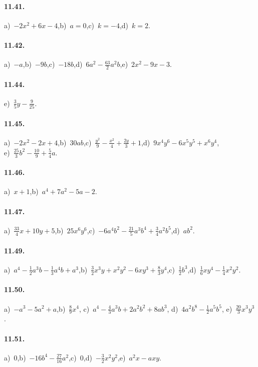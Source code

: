 \paragraph{11.41.}
a)~$-2x^2+6x-4$,\quad b)~$a=0$,\quad c)~$k=-4$,\quad d)~$k=2$.
\paragraph{11.42.} a)~$-a$,\quad b)~$-9b$,\quad c)~$-18b$,\quad d)~$6a^{2}-\frac{63}{2}a^{2}b$,\quad e)~$2x^2-9x-3$.
\paragraph{11.44.} e)~$\frac{3}{5}y-\frac{9}{25}$.
\paragraph{11.45.} a)~$-2x^{2}-2x+4$,\quad b)~$30ab$,\quad c)~$\frac{y^{2}}{9}-\frac{x^{2}}{4}+\frac{2y}{3}+1$,\quad d)~$9x^{4}y^{6}-6x^{5}y^{5}+x^{6}y^{4}$,\protect\\ e)~$\frac{25}{3}b^{2}-\frac{10}{9}+\frac{5}{4}a$.
\paragraph{11.46.} a)~$x+1$,\quad b)~$a^{4}+7a^{2}-5a-2$.
\paragraph{11.47.} a)~$\frac{33}{4}x+10y+5$,\quad b)~$25x^{6}y^{6}$,\quad c)~$-6a^{4}b^{2}-\frac{21}{5} a^{3}b^{4}+\frac{3}{4}a^{2}b^{5}$,\quad d)~$ab^{2}$. %
\paragraph{11.49.} a)~$a^{4}-\frac{1}{2}a^{3}b-\frac{1}{3}a^{4}b+a^{3}$,\quad b)~$\frac{3}{2}x^{3}y+x^{2}y^{2}-6{xy}^{3}+\frac{8}{3}y^{4}$,\quad c)~$\frac{1}{2}b^{3}$,\quad d)~$\frac{1}{6}xy^{4}-\frac{1}{4}x^{2}y^{2}$.
\paragraph{11.50.} a)~$-a^{3}-5a^{2}+a$,\quad b)~$\frac{8}{9}x^{4}$,\; c)~$a^{4}-\frac{4}{3}a^{3}b+2a^{2}b^{2}+8ab^{3}$,\; d)~$4a^{2}b^{8}-\frac{1}{2}a^{5}b^{5}$,\; e)~$\frac{20}{3}x^{3}y^{3}$.
\paragraph{11.51.} a)~$0$,\quad b)~$-16b^{4}-\frac{27}{16}a^{2}$,\quad c)~$0$,\quad d)~$-\frac{3}{2}x^{2}y^{2}$,\quad e)~$a^{2}x-axy$.
